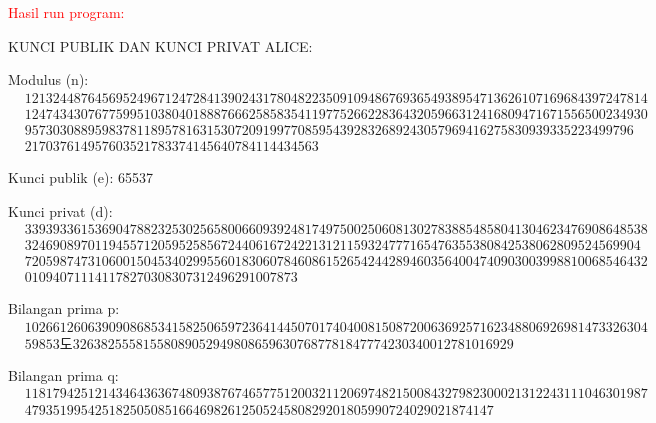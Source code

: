 \documentclass{article}
\begin{document}

\textcolor{red}{Hasil run program:}

KUNCI PUBLIK DAN KUNCI PRIVAT ALICE:

Modulus (n):
\[
\begin{aligned}
&12132448764569524967124728413902431780482235091094867693654938954713626107169684397247814 \\
&12474343076775995103804018887666258583541197752662283643205966312416809471671556500234930 \\
&957303088959837811895781631530720919977085954392832689243057969416275830939335223499796 \\
&217037614957603521783374145640784114434563
\end{aligned}
\]

Kunci publik (e): 65537

Kunci privat (d):
\[
\begin{aligned}
&33939336153690478823253025658006609392481749750025060813027838854858041304623476908648538 \\
&3246908970119455712059525856724406167242213121159324777165476355380842538062809524569904 \\
&72059874731060015045340299556018306078460861526542442894603564004740903003998810068546432 \\
&010940711141178270308307312496291007873
\end{aligned}
\]

Bilangan prima p:
\[
\begin{aligned}
&10266126063909086853415825065972364144507017404008150872006369257162348806926981473326304 \\
&59853도326382555815580890529498086596307687781847774230340012781016929
\end{aligned}
\]

Bilangan prima q:
\[
\begin{aligned}
&11817942512143464363674809387674657751200321120697482150084327982300021312243111046301987 \\
&4793519954251825050851664698261250524580829201805990724029021874147
\end{aligned}
\]
\end{document}
